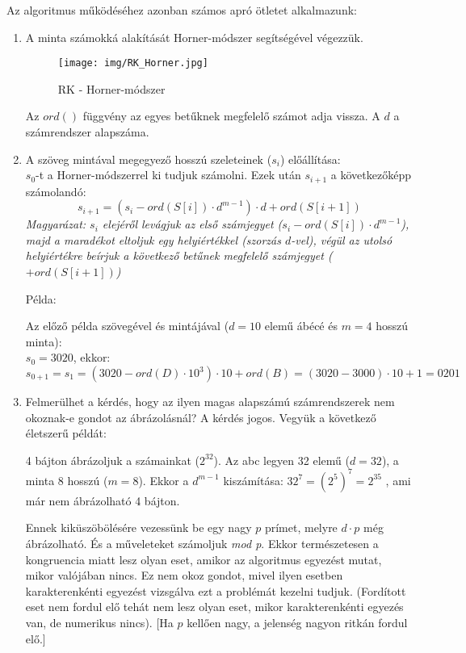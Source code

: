 \documentclass[margin=0px]{article}
\begin{document}
\noindent
Az algoritmus működéséhez azonban számos apró ötletet alkalmazunk:
\begin{enumerate}
    \item A minta számokká alakítását Horner-módszer segítségével végezzük.
          \begin{figure}[H]
              \centering
              \texttt{[image: img/RK\_Horner.jpg]}
              \caption{RK - Horner-módszer}
              \label{fig:RK_Horner}
          \end{figure}
          Az $ord()$ függvény az egyes betűknek megfelelő számot adja vissza. A $d$ a számrendszer alapszáma.
    \item A szöveg mintával megegyező hosszú szeleteinek ($s_i$) előállítása: \\
          $s_0$-t a Horner-módszerrel ki tudjuk számolni. Ezek után $s_{i+1}$ a következőképp számolandó:
          \[s_{i+1} = (s_i - ord(S[i])\cdot d^{m-1})\cdot d  + ord(S[i+1])\]
          \textit{Magyarázat: $s_i$ elejéről levágjuk az első számjegyet ($s_i - ord(S[i])\cdot d^{m-1}$), majd a maradékot eltoljuk egy helyiértékkel (szorzás $d$-vel), végül az utolsó helyiértékre beírjuk a következő betűnek megfelelő számjegyet ($+ord(S[i+1])$)}

          Példa:

          Az előző példa szövegével és mintájával ($d=10$ elemű ábécé és $m=4$ hosszú minta): \\
          $s_0 = 3020$, ekkor: $s_{0+1} = s_1 = (3020 - ord(D) \cdot 10^3)\cdot 10 + ord(B) = (3020-3000)\cdot 10 +1 = 0201$
    \item Felmerülhet a kérdés, hogy az ilyen magas alapszámú számrendszerek nem okoznak-e gondot az ábrázolásnál? A kérdés jogos. Vegyük a következő életszerű példát:

          4 bájton ábrázoljuk a számainkat ($2^{32}$). Az abc legyen 32 elemű ($d=32$), a minta 8 hosszú ($m=8$). Ekkor a $d^{m-1}$ kiszámítása: $32^7 = (2^5)^7 = 2^{35}$ , ami már nem ábrázolható 4 bájton.

          Ennek kiküszöbölésére vezessünk be egy nagy $p$ prímet, melyre $d\cdot p$ még ábrázolható. És a műveleteket számoljuk {\it mod p}. Ekkor természetesen a kongruencia miatt lesz olyan eset, amikor az algoritmus egyezést mutat, mikor valójában nincs. Ez nem okoz gondot, mivel ilyen esetben karakterenkénti egyezést vizsgálva ezt a problémát kezelni tudjuk. (Fordított eset nem fordul elő tehát nem lesz olyan eset, mikor karakterenkénti egyezés van, de numerikus nincs). [Ha $p$ kellően nagy, a jelenség nagyon ritkán fordul elő.]


\end{enumerate}
\end{document}
